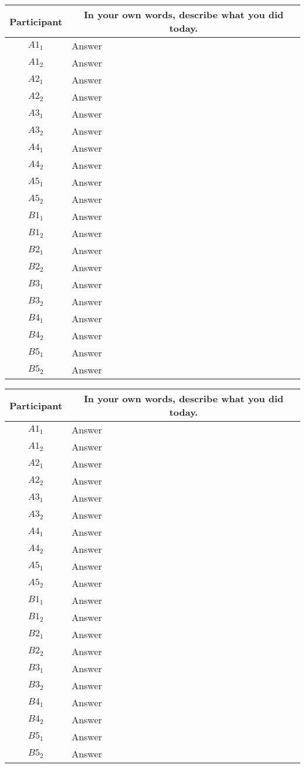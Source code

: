 \begin{tabularx}{\linewidth}{@{}cX@{}}
  \toprule
  Participant & \multicolumn{1}{c}{
    \textbf{In your own words, describe what you did today.}
  } \\ \midrule
  $A1_{1}$ & Answer \\
  $A1_{2}$ & Answer \\
  $A2_{1}$ & Answer \\
  $A2_{2}$ & Answer \\
  $A3_{1}$ & Answer \\
  $A3_{2}$ & Answer \\
  $A4_{1}$ & Answer \\
  $A4_{2}$ & Answer \\
  $A5_{1}$ & Answer \\
  $A5_{2}$ & Answer \\
  \midrule
  $B1_{1}$ & Answer \\
  $B1_{2}$ & Answer \\
  $B2_{1}$ & Answer \\
  $B2_{2}$ & Answer \\
  $B3_{1}$ & Answer \\
  $B3_{2}$ & Answer \\
  $B4_{1}$ & Answer \\
  $B4_{2}$ & Answer \\
  $B5_{1}$ & Answer \\
  $B5_{2}$ & Answer \\
  \bottomrule
\end{tabularx}{\parfillskip=0pt\par}
\noindent
\begin{tabularx}{\linewidth}{@{}cX@{}}
  \toprule
  Participant & \multicolumn{1}{c}{
    \textbf{In your own words, describe what you did today.}
  } \\ \midrule
  $A1_{1}$ & Answer \\
  $A1_{2}$ & Answer \\
  $A2_{1}$ & Answer \\
  $A2_{2}$ & Answer \\
  $A3_{1}$ & Answer \\
  $A3_{2}$ & Answer \\
  $A4_{1}$ & Answer \\
  $A4_{2}$ & Answer \\
  $A5_{1}$ & Answer \\
  $A5_{2}$ & Answer \\
  \midrule
  $B1_{1}$ & Answer \\
  $B1_{2}$ & Answer \\
  $B2_{1}$ & Answer \\
  $B2_{2}$ & Answer \\
  $B3_{1}$ & Answer \\
  $B3_{2}$ & Answer \\
  $B4_{1}$ & Answer \\
  $B4_{2}$ & Answer \\
  $B5_{1}$ & Answer \\
  $B5_{2}$ & Answer \\
  \bottomrule
\end{tabularx}{\parfillskip=0pt\par}
